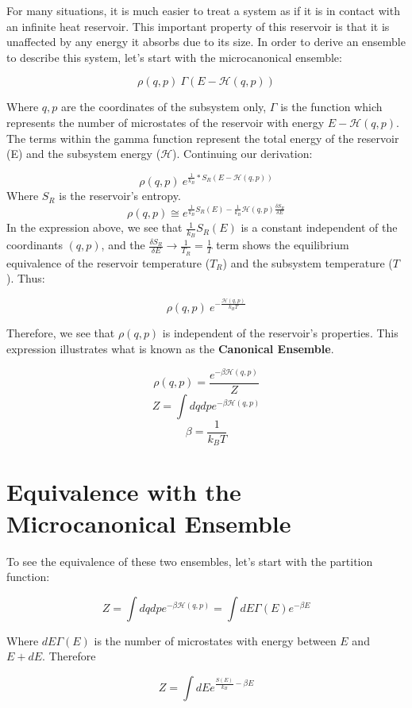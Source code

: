 \documentclass{article}
\newcommand{\pardif}[2]{\frac{\delta#1}{\delta#2}}
\newcommand{\bltz}{k_{B}}
\begin{document}

For many situations, it is much easier to treat a system as if it is in contact with an infinite heat reservoir.  This important property of this reservoir is that it is unaffected by any energy it absorbs due to its size.  In order to derive an ensemble to describe this system, let's start with the microcanonical ensemble:

$$\rho(q,p)~\Gamma(E-\mathcal{H}(q,p))$$

Where $q,p$ are the coordinates of the subsystem only, $\Gamma$ is the function which represents the number of microstates of the reservoir with energy $E-\mathcal{H}(q,p)$.  The terms within the gamma function represent the total energy of the reservoir (E) and the subsystem energy ($\mathcal{H}$).  Continuing our derivation:

$$\rho(q,p)~e^{\frac{1}{\bltz}*S_{R}(E-\mathcal{H}(q,p))}$$
Where $S_{R}$ is the reservoir's entropy.
$$\rho(q,p)\cong e^{\frac{1}{\bltz}S_{R}(E)-\frac{1}{\bltz}\mathcal{H}(q,p)\pardif{S_{R}}{E}}$$
In the expression above, we see that $\frac{1}{\bltz}S_{R}(E)$ is a constant independent of the coordinants $(q,p)$, and the $\pardif{S_{R}}{E}\rightarrow\frac{1}{T_{R}}=\frac{1}{T}$ term shows the equilibrium equivalence of the reservoir temperature ($T_{R}$) and the subsystem temperature ($T$).  Thus:

$$\rho(q,p)~e^{-\frac{\mathcal{H}(q,p)}{\bltz T}}$$

Therefore, we see that $\rho(q,p)$ is independent of the reservoir's properties.  This expression illustrates what is known as the \textbf{Canonical Ensemble}.

$$\rho(q,p)=\frac{e^{-\beta\mathcal{H}(q,p)}}{Z}$$
$$Z=\int dqdpe^{-\beta\mathcal{H}(q,p)}$$
$$\beta=\frac{1}{\bltz T}$$

\section{Equivalence with the Microcanonical Ensemble}

To see the equivalence of these two ensembles, let's start with the partition function:

$$Z=\int dqdpe^{-\beta\mathcal{H}(q,p)}=\int dE\Gamma(E)e^{-\beta E}$$

Where $dE\Gamma(E)$ is the number of microstates with energy between $E$ and $E+dE$.  Therefore

$$Z=\int dE e^{\frac{S(E)}{\bltz}-\beta E}$$
\end{document}

